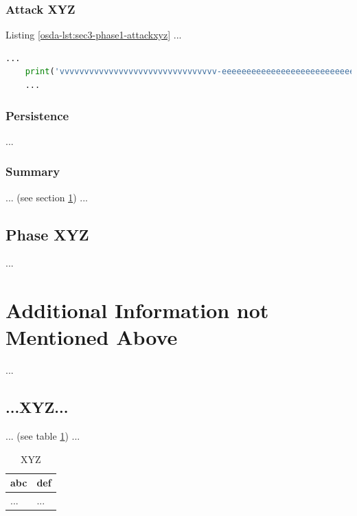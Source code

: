 \subsubsection{Attack XYZ}\label{osda-sec:sec3-phase1-attackxyz}
%
Listing \ref{osda-lst:sec3-phase1-attackxyz} ...\\

\begin{lstlisting}[language=Python,caption={Proof of Concept}, label={osda-lst:sec3-phase1-attackxyz}]
    ...
    print('vvvvvvvvvvvvvvvvvvvvvvvvvvvvvvvv-eeeeeeeeeeeeeeeeeeeeeeeeeeeeeeeeeeeeeeeeeee-looooooooooooooooooooooong-striiiiiiiiiiiiiing')
    ...
\end{lstlisting}
%
%
%
\subsubsection{Persistence}\label{osda-sec:sec3-phase1-pers}
%
...
%
%
%
\subsubsection{Summary}\label{osda-sec:sec3-phase1-sum}
%
... (see section \ref{osda-sec:last}) ...
%
%
%
\subsection{Phase XYZ}\label{osda-sec:sec3-phasexyz}
%
...
%
%
%
\section{Additional Information not Mentioned Above}\label{osda-sec:last}
%
...
%
%
%
\subsection{...XYZ...}\label{osda-sec:last-xyz}
%
... (see table \ref{osda-tbl:last-xyz}) ...

\begin{table}[H]
    \begin{tabularx}{\textwidth}{l|l}
        \textbf{abc} & \textbf{def} \\
        \hline
        ... & ...\\
    \end{tabularx}
    \caption{XYZ\label{osda-tbl:last-xyz}}
\end{table}
%
%
%
